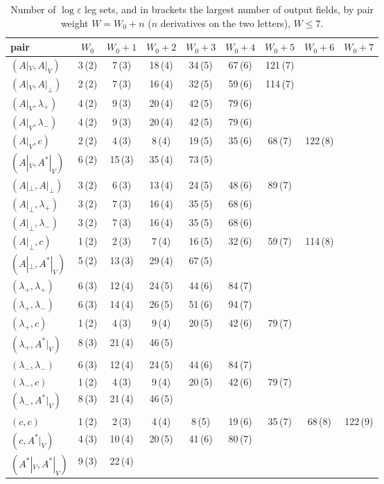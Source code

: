 \documentclass[11pt]{article}
\numberwithin{equation}{section}
\theoremstyle{plain}
\theoremstyle{definition}
\begin{document}
\begin{table}[h]
\centering\scriptsize
\begin{tabular}{l|cccccccc}
pair & $W_0$ & $W_0+1$ & $W_0+2$ & $W_0+3$ & $W_0+4$ & $W_0+5$ & $W_0+6$ & $W_0+7$\\\hline
$(A|_V,A|_V)$ & 3\,(2) & 7\,(3) & 18\,(4) & 34\,(5) & 67\,(6) & 121\,(7) &  & \\
$(A|_V,A|_\perp)$ & 2\,(2) & 7\,(3) & 16\,(4) & 32\,(5) & 59\,(6) & 114\,(7) &  & \\
$(A|_V,\lambda_+)$ & 4\,(2) & 9\,(3) & 20\,(4) & 42\,(5) & 79\,(6) &  &  & \\
$(A|_V,\lambda_-)$ & 4\,(2) & 9\,(3) & 20\,(4) & 42\,(5) & 79\,(6) &  &  & \\
$(A|_V,c)$ & 2\,(2) & 4\,(3) & 8\,(4) & 19\,(5) & 35\,(6) & 68\,(7) & 122\,(8) & \\
$(A|_V,A^*|_V)$ & 6\,(2) & 15\,(3) & 35\,(4) & 73\,(5) &  &  &  & \\
$(A|_\perp,A|_\perp)$ & 3\,(2) & 6\,(3) & 13\,(4) & 24\,(5) & 48\,(6) & 89\,(7) &  & \\
$(A|_\perp,\lambda_+)$ & 3\,(2) & 7\,(3) & 16\,(4) & 35\,(5) & 68\,(6) &  &  & \\
$(A|_\perp,\lambda_-)$ & 3\,(2) & 7\,(3) & 16\,(4) & 35\,(5) & 68\,(6) &  &  & \\
$(A|_\perp,c)$ & 1\,(2) & 2\,(3) & 7\,(4) & 16\,(5) & 32\,(6) & 59\,(7) & 114\,(8) & \\
$(A|_\perp,A^*|_V)$ & 5\,(2) & 13\,(3) & 29\,(4) & 67\,(5) &  &  &  & \\
$(\lambda_+,\lambda_+)$ & 6\,(3) & 12\,(4) & 24\,(5) & 44\,(6) & 84\,(7) &  &  & \\
$(\lambda_+,\lambda_-)$ & 6\,(3) & 14\,(4) & 26\,(5) & 51\,(6) & 94\,(7) &  &  & \\
$(\lambda_+,c)$ & 1\,(2) & 4\,(3) & 9\,(4) & 20\,(5) & 42\,(6) & 79\,(7) &  & \\
$(\lambda_+,A^*|_V)$ & 8\,(3) & 21\,(4) & 46\,(5) &  &  &  &  & \\
$(\lambda_-,\lambda_-)$ & 6\,(3) & 12\,(4) & 24\,(5) & 44\,(6) & 84\,(7) &  &  & \\
$(\lambda_-,c)$ & 1\,(2) & 4\,(3) & 9\,(4) & 20\,(5) & 42\,(6) & 79\,(7) &  & \\
$(\lambda_-,A^*|_V)$ & 8\,(3) & 21\,(4) & 46\,(5) &  &  &  &  & \\
$(c,c)$ & 1\,(2) & 2\,(3) & 4\,(4) & 8\,(5) & 19\,(6) & 35\,(7) & 68\,(8) & 122\,(9)\\
$(c,A^*|_V)$ & 4\,(3) & 10\,(4) & 20\,(5) & 41\,(6) & 80\,(7) &  &  & \\
$(A^*|_V,A^*|_V)$ & 9\,(3) & 22\,(4) &  &  &  &  &  & \\
\end{tabular}
\caption{Number of $\log\varepsilon$ leg sets, and in brackets the largest number of output fields, by pair weight $W=W_0+n$ ($n$ derivatives on the two letters), $W\le7$.}
\label{tab:tl-B}
\end{table}
\end{document}
